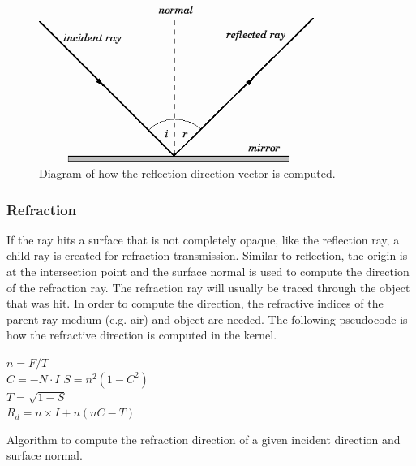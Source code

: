 \documentclass[final]{cmpreport}
\begin{document}
\begin{figure}
    \centering
    \includegraphics[width=0.8\textwidth]{img/reflection_diagram.png}
    \caption{Diagram of how the reflection direction vector is computed. \citep{fitzpatrickreflect}}
\end{figure}

\subsubsection{Refraction}

If the ray hits a surface that is not completely opaque, like the reflection ray, a child ray is created for refraction transmission. Similar to reflection, the origin is at the intersection point and the surface normal is used to compute the direction of the refraction ray. The refraction ray will usually be traced through the object that was hit. In order to compute the direction, the refractive indices of the parent ray medium (e.g. air) and object are needed. The following pseudocode is how the refractive direction is computed in the kernel.

\begin{algorithm} [H]
\SetAlgoLined
{}

$n = F / T$ \\
$C = -N \cdot I$  
$S = n^2(1 - C^2)$ \\
$T = \sqrt{1 - S}$ \\
$R_d = n \times I + n(nC - T)$


\caption{Algorithm to compute the refraction direction of a given incident direction and surface normal.}
\end{algorithm}
\end{document}
